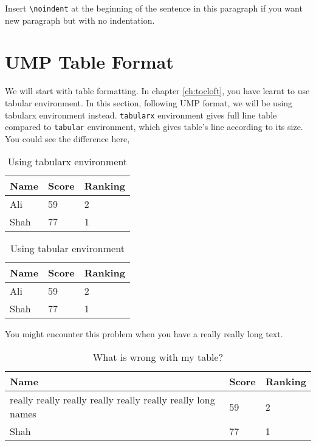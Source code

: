 \noindent Insert \verb+\noindent+ at the beginning of the sentence in this paragraph if you want new paragraph but with no indentation.

\section{UMP Table Format}
We will start with table formatting. In chapter \ref{ch:tocloft}, you have learnt to use tabular environment. In this section, following UMP format, we will be using tabularx environment instead. \verb+tabularx+ environment gives full line table compared to \verb+tabular+ environment, which gives table's line according to its size.\\

\noindent You could see the difference here,

\begin{table}[h!]
\caption{Using tabularx environment} 
\begin{tabularx}{1\linewidth}{XXX}    \addlinespace
    \toprule
    Name & Score & Ranking \\
    \toprule
    Ali & 59 & 2 \\
    Shah & 77 & 1 \\
    \bottomrule
    \end{tabularx}
\end{table}

\begin{table}[h!]
\caption{Using tabular environment}
\begin{tabular}{lll}
\toprule
    Name & Score & Ranking \\
    \toprule
    Ali & 59 & 2 \\
    Shah & 77 & 1 \\
    \bottomrule
\end{tabular}
\end{table}

\cleardoublepage %
 
You might encounter this problem when you have a really really long text. 

\begin{table}[h!]
\caption{What is wrong with my table?} 
\begin{tabularx}{1\linewidth}{XXX}    \addlinespace
    \toprule
    Name & Score & Ranking \\
    \toprule
    really really really really really really really long names & 59 & 2 \\
    Shah & 77 & 1 \\
    \bottomrule
    \end{tabularx}
\end{table}

